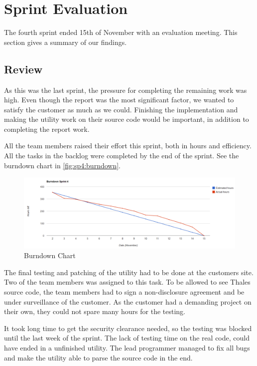 \section{Sprint Evaluation}
\label{sec:sp4eval}
The fourth sprint ended 15th of November with an evaluation meeting. This section gives a summary of our findings.

\subsection{Review}
As this was the last sprint, the pressure for completing the remaining work was high. Even though the report was the most significant factor, we wanted to satisfy the customer as much as we could. Finishing the implementation and making the utility work on their source code would be important, in addition to completing the report work.

All the team members raised their effort this sprint, both in hours and efficiency. All the tasks in the backlog were completed by the end of the sprint. See the burndown chart in \autoref{fig:sp4:burndown}.
\begin{figure}[!htb]
	\includegraphics[width=\textwidth]{./sprints/img/burndown_chart_s4}
	\caption{Burndown Chart\label{fig:sp4:burndown}}
\end{figure}

The final testing and patching of the utility had to be done at the customers site. Two of the team members was assigned to this task. To be allowed to see Thales source code, the team members had to sign a non-disclosure agreement and be under surveillance of the customer. As the customer had a demanding project on their own, they could not spare many hours for the testing.

It took long time to get the security clearance needed, so the testing was blocked until the last week of the sprint. The lack of testing time on the real code, could have ended in a unfinished utility. The lead programmer managed to fix all bugs and make the utility able to parse the source code in the end.


